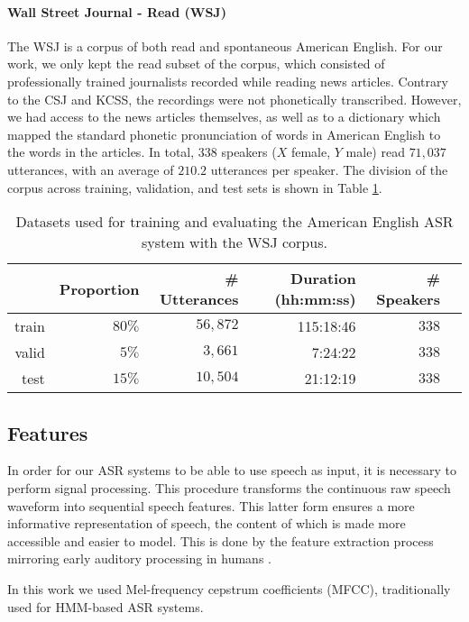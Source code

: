 \paragraph{Wall Street Journal - Read (WSJ)}
The WSJ \cite{paul1992} is a corpus of both read and spontaneous American English.
For our work, we only kept the read subset of the corpus, which consisted of {\color{red}professionally trained journalists} recorded while reading news articles. Contrary to the CSJ and KCSS, the recordings were not phonetically transcribed. However, we had access to the news articles themselves, as well as to a dictionary which mapped the standard phonetic pronunciation of words in American English to the words in the articles.
In total, $338$ speakers {\color{red}($X$ female, $Y$ male)} read $71,037$ utterances, with an average of $210.2$ utterances per speaker. The division of the corpus across training, validation, and test sets is shown in Table \ref{tab:hmm_wsj}. 

\begin{table}[htb]
\centering
\caption{Datasets used for training and evaluating the American English ASR system with the WSJ corpus.}
\label{tab:hmm_wsj}
\vspace{0.25cm}
\begin{tabular}{rrrrrr}
  \toprule
      & Proportion & \# Utterances & Duration (hh:mm:ss) & \# Speakers &  \\ \midrule
  train & $80\%$ &  $56,872$ &   115:18:46   &   $338$    &  \\
  valid & $5\%$ &  $3,661$ &  7:24:22  &  $338$  &  \\
  test  & $15\%$ &  $10,504$ & 21:12:19  & $338$    & \\ \bottomrule
\end{tabular}
\end{table}
      
\subsection{Features}
In order for our ASR systems to be able to use speech as input, it is necessary to perform signal processing. This procedure transforms the continuous raw speech waveform into sequential speech features. This latter form ensures a more informative representation of speech, the content of which is made more accessible and easier to model. This is done by the feature extraction process mirroring early auditory processing in humans \cite{schatz2016}.

In this work we used Mel-frequency cepstrum coefficients (MFCC), traditionally used for HMM-based ASR systems.

